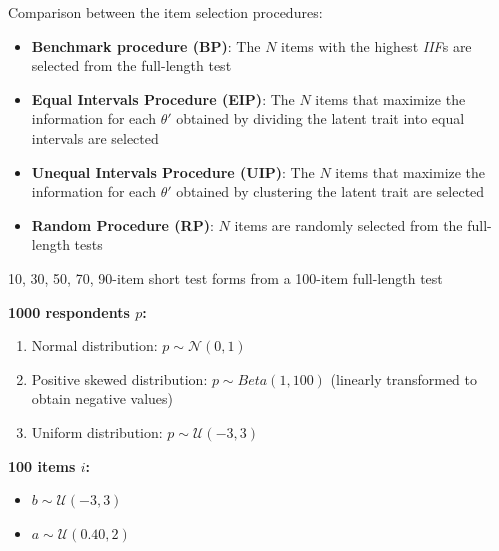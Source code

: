 \documentclass[aspectratio=149, compress]{beamer}
\begin{document}

\begin{frame}
	Comparison between the item selection procedures: 
	\begin{itemize}
		\item \textbf{\textcolor{bp}{Benchmark procedure (BP)}}: The $N$ items with the highest \emph{IIF}s are selected from the full-length test
		\item \textbf{\textcolor{eip}{Equal Intervals Procedure (EIP)}}: The $N$ items that maximize the information for each $\theta'$ obtained by dividing the latent trait into equal intervals are selected
		\item \textbf{\textcolor{uip}{Unequal Intervals Procedure (UIP)}}:  The $N$ items that maximize the information for each $\theta'$ obtained by clustering the latent trait are selected 
		
		\item \textbf{\textcolor{rp}{Random Procedure (RP)}}: $N$ items are randomly selected from the full-length tests 
	\end{itemize}
	\vspace{3mm}
	10, 30, 50, 70, 90-item short test forms from a  100-item full-length test 
	
\end{frame}



\begin{frame}

			\begin{center}
				\textbf{1000 respondents $p$:}
			\end{center}
			\begin{enumerate}
				\item Normal distribution: $p \sim \mathcal{N}(0,1)$
				\item Positive skewed distribution: $p \sim Beta(1, 100)$ \tiny(linearly transformed to obtain negative values)
				\normalsize
				\item Uniform distribution: $p \sim \mathcal{U}(-3,3)$
			\end{enumerate}
			
			\vspace{3mm}
			\begin{center}
			\textbf{	100 items $i$:}
			\end{center}
			\begin{itemize}
				\item $b \sim \mathcal{U}(-3,3)$
				\item  $a \sim \mathcal{U}(0.40,2)$
			\end{itemize}
\end{frame}
\end{document}
